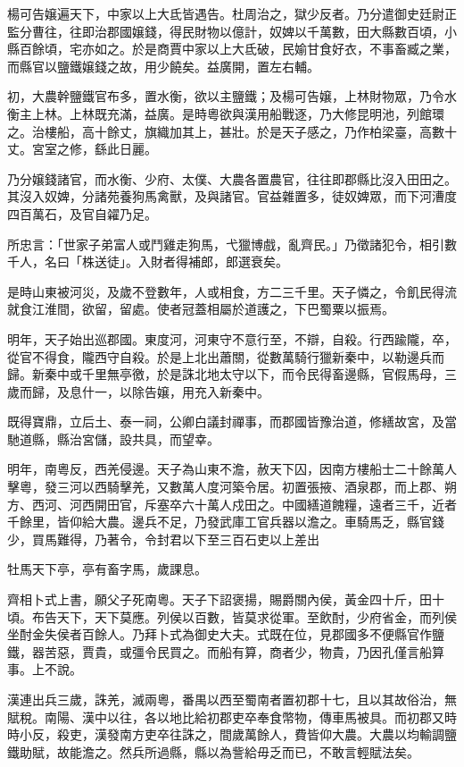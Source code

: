 \begin{pinyinscope}
楊可告嬢遍天下，中家以上大氐皆遇告。杜周治之，獄少反者。乃分遣御史廷尉正監分曹往，往即治郡國嬢錢，得民財物以億計，奴婢以千萬數，田大縣數百頃，小縣百餘頃，宅亦如之。於是商賈中家以上大氐破，民媮甘食好衣，不事畜臧之業，而縣官以鹽鐵嬢錢之故，用少饒矣。益廣開，置左右輔。

初，大農幹鹽鐵官布多，置水衡，欲以主鹽鐵；及楊可告嬢，上林財物眾，乃令水衡主上林。上林既充滿，益廣。是時粵欲與漢用船戰逐，乃大修昆明池，列館環之。治樓船，高十餘丈，旗織加其上，甚壯。於是天子感之，乃作柏梁臺，高數十丈。宮室之修，繇此日麗。

乃分嬢錢諸官，而水衡、少府、太僕、大農各置農官，往往即郡縣比沒入田田之。其沒入奴婢，分諸苑養狗馬禽獸，及與諸官。官益雜置多，徒奴婢眾，而下河漕度四百萬石，及官自糴乃足。

所忠言：「世家子弟富人或鬥雞走狗馬，弋獵博戲，亂齊民。」乃徵諸犯令，相引數千人，名曰「株送徒」。入財者得補郎，郎選衰矣。

是時山東被河災，及歲不登數年，人或相食，方二三千里。天子憐之，令飢民得流就食江淮間，欲留，留處。使者冠蓋相屬於道護之，下巴蜀粟以振焉。

明年，天子始出巡郡國。東度河，河東守不意行至，不辯，自殺。行西踰隴，卒，從官不得食，隴西守自殺。於是上北出蕭關，從數萬騎行獵新秦中，以勒邊兵而歸。新秦中或千里無亭徼，於是誅北地太守以下，而令民得畜邊縣，官假馬母，三歲而歸，及息什一，以除告嬢，用充入新秦中。

既得寶鼎，立后土、泰一祠，公卿白議封禪事，而郡國皆豫治道，修繕故宮，及當馳道縣，縣治宮儲，設共具，而望幸。

明年，南粵反，西羌侵邊。天子為山東不澹，赦天下囚，因南方樓船士二十餘萬人擊粵，發三河以西騎擊羌，又數萬人度河築令居。初置張掖、酒泉郡，而上郡、朔方、西河、河西開田官，斥塞卒六十萬人戍田之。中國繕道餽糧，遠者三千，近者千餘里，皆仰給大農。邊兵不足，乃發武庫工官兵器以澹之。車騎馬乏，縣官錢少，買馬難得，乃著令，令封君以下至三百石吏以上差出

牡馬天下亭，亭有畜字馬，歲課息。

齊相卜式上書，願父子死南粵。天子下詔褒揚，賜爵關內侯，黃金四十斤，田十頃。布告天下，天下莫應。列侯以百數，皆莫求從軍。至飲酎，少府省金，而列侯坐酎金失侯者百餘人。乃拜卜式為御史大夫。式既在位，見郡國多不便縣官作鹽鐵，器苦惡，賈貴，或彊令民買之。而船有算，商者少，物貴，乃因孔僅言船算事。上不說。

漢連出兵三歲，誅羌，滅兩粵，番禺以西至蜀南者置初郡十七，且以其故俗治，無賦稅。南陽、漢中以往，各以地比給初郡吏卒奉食幣物，傳車馬被具。而初郡又時時小反，殺吏，漢發南方吏卒往誅之，間歲萬餘人，費皆仰大農。大農以均輸調鹽鐵助賦，故能澹之。然兵所過縣，縣以為訾給毋乏而已，不敢言輕賦法矣。


\end{pinyinscope}
